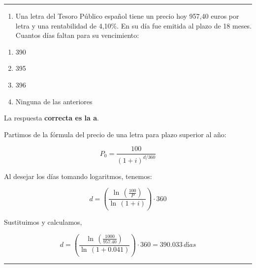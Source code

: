 \documentclass[
  letterpaper,
  DIV=11,
  numbers=noendperiod]{scrreprt}
\providecommand{\tightlist}{%
  \setlength{\itemsep}{0pt}\setlength{\parskip}{0pt}}\usepackage{longtable,booktabs,array}
\begin{document}
\begin{center}\rule{0.5\linewidth}{0.5pt}\end{center}

\begin{enumerate}
\def\labelenumi{\arabic{enumi}.}
\setcounter{enumi}{11}
\tightlist
\item
  Una letra del Tesoro Público español tiene un precio hoy 957,40 euros
  por letra y una rentabilidad de 4,10\%. En su día fue emitida al plazo
  de 18 meses. Cuantos días faltan para su vencimiento:
\end{enumerate}

\begin{enumerate}
\def\labelenumi{\alph{enumi}.}
\item
  390
\item
  395
\item
  396
\item
  Ninguna de las anteriores
\end{enumerate}

\begin{tcolorbox}[enhanced jigsaw, left=2mm, opacityback=0, colback=white, breakable, arc=.35mm, bottomrule=.15mm, rightrule=.15mm, toprule=.15mm, leftrule=.75mm, colframe=quarto-callout-tip-color-frame]
\begin{minipage}[t]{5.5mm}
\textcolor{quarto-callout-tip-color}{\faLightbulb}
\end{minipage}%
\begin{minipage}[t]{\textwidth - 5.5mm}

La respuesta \textbf{correcta es la a}.

Partimos de la fórmula del precio de una letra para plazo superior al
año:

\[P_0=\frac{100}{(1+i)^{d/360}}\]

Al desejar los días tomando logaritmos, tenemos:

\[d=\left(\frac{\ln\,\left(\frac{100}{P}\right)}{\ln\,\left(1+i\right)}\right)\cdot360\]

Sustituimos y calculamos,

\[d=\left(\frac{\ln\,\left(\frac{1000}{957.40}\right)}{\ln\,\left(1+0.041\right)}\right)\cdot360=390.033\,días\]

\end{minipage}%
\end{tcolorbox}

\begin{center}\rule{0.5\linewidth}{0.5pt}\end{center}
\end{document}

